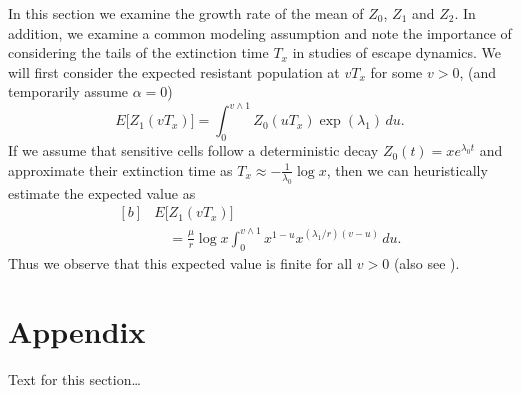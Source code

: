 \documentclass{bmcart}
\begin{document}
In this section we examine the growth rate of the mean of $Z_0$, $Z_1$ and $Z_2$. In
addition, we examine a common modeling assumption and note the
importance of considering the tails of the extinction time $T_x$ in
studies of escape dynamics.
We will first consider the expected resistant population at $vT_x$ for
some $v>0$, (and temporarily assume $\alpha=0$)
%
\[
E \bigl[Z_1(vT_x) \bigr]=
\int_0^{v\wedge
1}Z_0(uT_x)
\exp (\lambda_1)\,du .
\]
%
If we assume that sensitive cells follow a deterministic decay
$Z_0(t)=xe^{\lambda_0 t}$ and approximate their extinction time as
$T_x\approx-\frac{1}{\lambda_0}\log x$, then we can heuristically
estimate the expected value as
%
\begin{equation}\label{eqexpmuts}
\begin{aligned}[b]
&      E\bigl[Z_1(vT_x)\bigr]\\
&\quad      = \frac{\mu}{r}\log x
\int_0^{v\wedge1}x^{1-u}x^{({\lambda_1}/{r})(v-u)}\,du .
\end{aligned}
\end{equation}
%
Thus we observe that this expected value is finite for all $v>0$ (also see \cite{koon,xjon,marg,schn,koha,issnic}).


\section*{Appendix}
Text for this section\ldots

\end{document}
